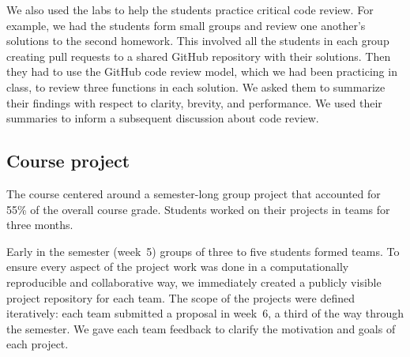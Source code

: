 We also used the labs to help the students practice critical code review.
For example, we had the students form small groups and review one another's
solutions to the second homework.
This involved all the students in each group creating pull requests to a
shared GitHub repository with their solutions.
Then they had to use the GitHub code review model, which we had been practicing
in class, to review three functions in each solution.
We asked them to summarize their findings with respect to
clarity, brevity, and performance.
We used their summaries to inform a subsequent discussion about code review.

\subsection{Course project}\label{project}

The course centered around a semester-long group project that accounted for 55\%
of the overall course grade.
Students worked on their projects in teams for three months.


Early in the semester (week~5) groups of three to five students formed teams.
To ensure every aspect of the project work was done in a computationally
reproducible and collaborative way, we immediately created a publicly visible
project repository for each team.
The scope of the projects were defined iteratively: each team submitted a
proposal in week~6, a third of the way through the semester. We gave each team
feedback to clarify the motivation and goals of each project.


